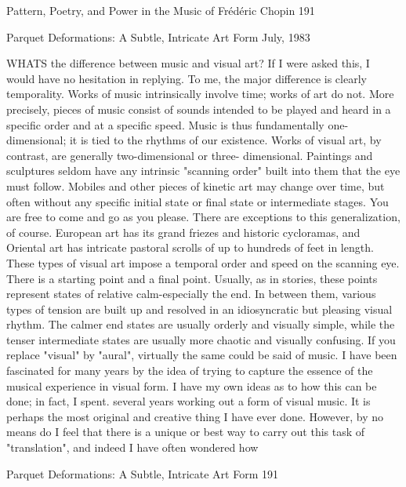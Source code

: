 Pattern, Poetry, and Power in the Music of Frédéric Chopin                               191


                      Parquet Deformations:
                    A Subtle, Intricate Art Form
                                         July, 1983


WHATS the difference between music and visual art? If I were asked this, I would
have no hesitation in replying. To me, the major difference is clearly temporality. Works
of music intrinsically involve time; works of art do not. More precisely, pieces of music
consist of sounds intended to be played and heard in a specific order and at a specific
speed. Music is thus fundamentally one-dimensional; it is tied to the rhythms of our
existence. Works of visual art, by contrast, are generally two-dimensional or three-
dimensional. Paintings and sculptures seldom have any intrinsic "scanning order" built
into them that the eye must follow. Mobiles and other pieces of kinetic art may change
over time, but often without any specific initial state or final state or intermediate stages.
You are free to come and go as you please.
        There are exceptions to this generalization, of course. European art has its grand
friezes and historic cycloramas, and Oriental art has intricate pastoral scrolls of up to
hundreds of feet in length. These types of visual art impose a temporal order and speed
on the scanning eye. There is a starting point and a final point. Usually, as in stories,
these points represent states of relative calm-especially the end. In between them, various
types of tension are built up and resolved in an idiosyncratic but pleasing visual rhythm.
The calmer end states are usually orderly and visually simple, while the tenser
intermediate states are usually more chaotic and visually confusing. If you replace
"visual" by "aural", virtually the same could be said of music.
        I have been fascinated for many years by the idea of trying to capture the essence
of the musical experience in visual form. I have my own ideas as to how this can be done;
in fact, I spent. several years working out a form of visual music. It is perhaps the most
original and creative thing I have ever done. However, by no means do I feel that there is
a unique or best way to carry out this task of "translation", and indeed I have often
wondered how




Parquet Deformations: A Subtle, Intricate Art Form                                        191

